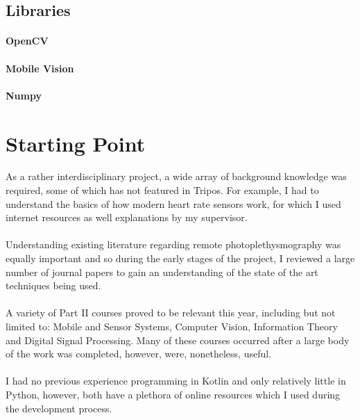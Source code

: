 \subsection{Libraries}
\label{section:libraries}
\paragraph{OpenCV}
\paragraph{Mobile Vision}
\paragraph{Numpy}


\section{Starting Point}
As a rather interdisciplinary project, a wide array of background knowledge was required, some of which has not featured in Tripos.
For example, I had to understand the basics of how modern heart rate sensors work, for which I used internet resources as well explanations by my supervisor.
\\\\
Understanding existing literature regarding remote photoplethysmography was equally important and so during the early stages of the project, I reviewed
a large number of journal papers to gain an understanding of the state of the art techniques being used.
\\\\
A variety of Part II courses proved to be relevant this year, including but not limited to: Mobile and Sensor Systems, Computer Vision, Information Theory and Digital Signal Processing. Many of these courses occurred after a large body of the work was completed, however, were, nonetheless, useful.
\\\\
I had no previous experience programming in Kotlin and only relatively little in Python, however, both have a plethora of online resources which I used 
during the development process.
